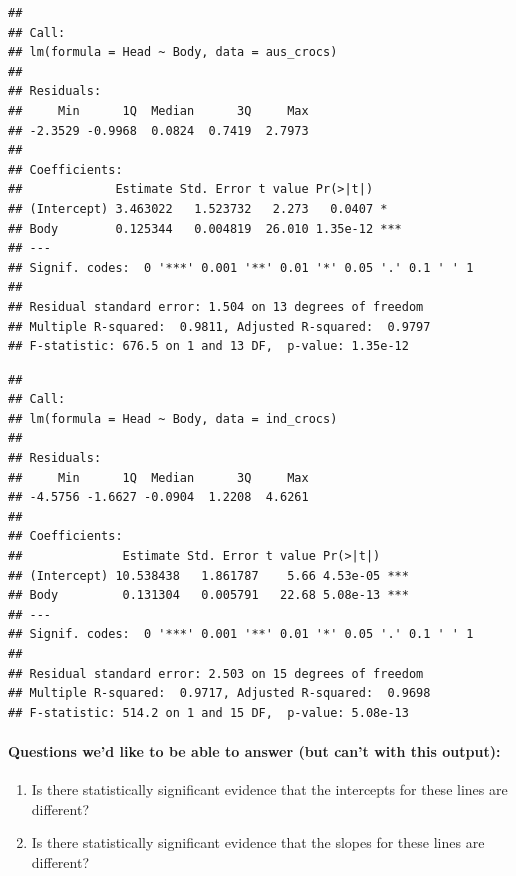 \documentclass[14pt]{extarticle}
\newenvironment{Shaded}{\begin{snugshade}}{\end{snugshade}}
\newcommand{\KeywordTok}[1]{\textcolor[rgb]{0.13,0.29,0.53}{\textbf{#1}}}
\newcommand{\DataTypeTok}[1]{\textcolor[rgb]{0.13,0.29,0.53}{#1}}
\newcommand{\StringTok}[1]{\textcolor[rgb]{0.31,0.60,0.02}{#1}}
\newcommand{\OperatorTok}[1]{\textcolor[rgb]{0.81,0.36,0.00}{\textbf{#1}}}
\newcommand{\NormalTok}[1]{#1}
\providecommand{\tightlist}{%
  \setlength{\itemsep}{0pt}\setlength{\parskip}{0pt}}
\let\oldparagraph\paragraph
\renewcommand{\paragraph}[1]{\oldparagraph{#1}\mbox{}}
\begin{document}
\begin{verbatim}
## 
## Call:
## lm(formula = Head ~ Body, data = aus_crocs)
## 
## Residuals:
##     Min      1Q  Median      3Q     Max 
## -2.3529 -0.9968  0.0824  0.7419  2.7973 
## 
## Coefficients:
##             Estimate Std. Error t value Pr(>|t|)    
## (Intercept) 3.463022   1.523732   2.273   0.0407 *  
## Body        0.125344   0.004819  26.010 1.35e-12 ***
## ---
## Signif. codes:  0 '***' 0.001 '**' 0.01 '*' 0.05 '.' 0.1 ' ' 1
## 
## Residual standard error: 1.504 on 13 degrees of freedom
## Multiple R-squared:  0.9811, Adjusted R-squared:  0.9797 
## F-statistic: 676.5 on 1 and 13 DF,  p-value: 1.35e-12
\end{verbatim}

\begin{Shaded}
\end{Shaded}

\begin{verbatim}
## 
## Call:
## lm(formula = Head ~ Body, data = ind_crocs)
## 
## Residuals:
##     Min      1Q  Median      3Q     Max 
## -4.5756 -1.6627 -0.0904  1.2208  4.6261 
## 
## Coefficients:
##              Estimate Std. Error t value Pr(>|t|)    
## (Intercept) 10.538438   1.861787    5.66 4.53e-05 ***
## Body         0.131304   0.005791   22.68 5.08e-13 ***
## ---
## Signif. codes:  0 '***' 0.001 '**' 0.01 '*' 0.05 '.' 0.1 ' ' 1
## 
## Residual standard error: 2.503 on 15 degrees of freedom
## Multiple R-squared:  0.9717, Adjusted R-squared:  0.9698 
## F-statistic: 514.2 on 1 and 15 DF,  p-value: 5.08e-13
\end{verbatim}

\paragraph{Questions we'd like to be able to answer (but can't with this
output):}\label{questions-wed-like-to-be-able-to-answer-but-cant-with-this-output}

\begin{enumerate}
\def\labelenumi{\arabic{enumi}.}
\tightlist
\item
  Is there statistically significant evidence that the intercepts for
  these lines are different?
\item
  Is there statistically significant evidence that the slopes for these
  lines are different?
\end{enumerate}
\end{document}
